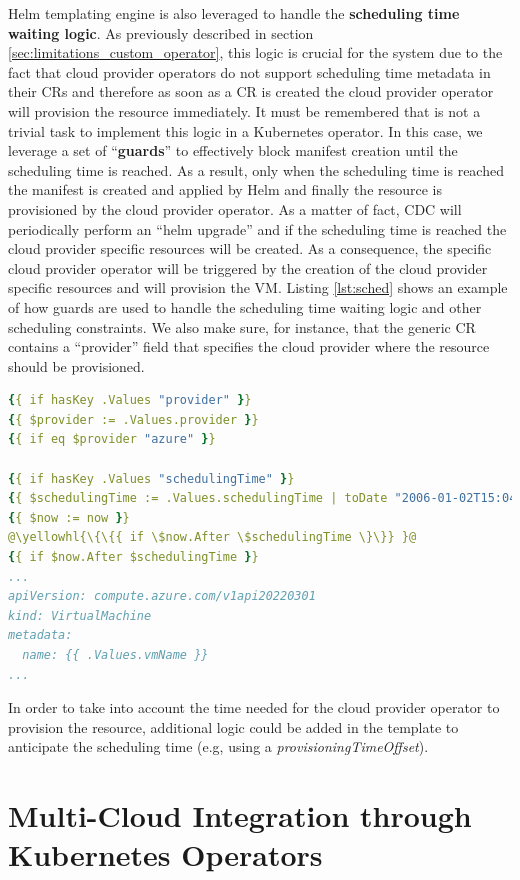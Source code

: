 Helm templating engine is also leveraged to handle the \textbf{scheduling time waiting logic}.
As previously described in section \ref{sec:limitations_custom_operator}, this logic is crucial for the system due to the fact that cloud provider operators do not support scheduling time metadata in their CRs and therefore as soon as a CR is created the cloud provider operator will provision the resource immediately.
It must be remembered that is not a trivial task to implement this logic in a Kubernetes operator.
In this case, we leverage a set of ``\textbf{guards}'' to effectively block manifest creation until the scheduling time is reached. 
As a result, only when the scheduling time is reached the manifest is created and applied by Helm and finally the resource is provisioned by the cloud provider operator.
As a matter of fact, CDC will periodically perform an ``helm upgrade'' and if the scheduling time is reached the cloud provider specific resources will be created. 
As a consequence, the specific cloud provider operator will be triggered by the creation of the cloud provider specific resources and will provision the VM.
Listing \ref{lst:sched} shows an example of how guards are used to handle the scheduling time waiting logic and other scheduling constraints.
We also make sure, for instance, that the generic CR contains a ``provider'' field that specifies the cloud provider where the resource should be provisioned.

\begin{lstlisting}[language=yaml, caption={Scheduling time}, label={lst:sched}]
{{ if hasKey .Values "provider" }}
{{ $provider := .Values.provider }}
{{ if eq $provider "azure" }}

{{ if hasKey .Values "schedulingTime" }}
{{ $schedulingTime := .Values.schedulingTime | toDate "2006-01-02T15:04:05Z" }}
{{ $now := now }}
@\yellowhl{\{\{{ if \$now.After \$schedulingTime \}\}} }@
{{ if $now.After $schedulingTime }}
...
apiVersion: compute.azure.com/v1api20220301
kind: VirtualMachine
metadata:
  name: {{ .Values.vmName }}
...
\end{lstlisting}

In order to take into account the time needed for the cloud provider operator to provision the resource, additional logic could be added in the template to anticipate the scheduling time (e.g, using a \textit{provisioningTimeOffset}).

\section{Multi-Cloud Integration through Kubernetes Operators}
\label{sec:cloud_providers_operators}

